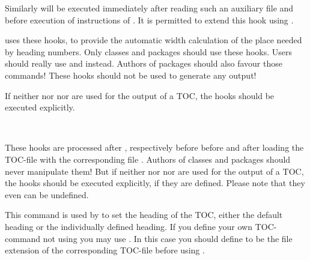 Similarly  will be executed immediately after
reading such an auxiliary file and before execution of instructions of
. It is permitted to extend this hook using
.

\KOMAScript{} uses these hooks, to provide the automatic width calculation of
the place needed by heading numbers. Only classes and packages should use
these hooks. Users should really use
 and  instead. Authors of
packages should also favour those commands! These hooks should not be used to
generate any output!

If neither  nor 
nor  are used for the output of a TOC, the hooks should be
executed explicitly.%
%
%

\begin{Declaration}
  \\
\end{Declaration}
%
%
These hooks are processed after , respectively
before  before and after loading the TOC-file with
the corresponding file . Authors  of
classes and packages should never manipulate them! But if
neither  nor  nor
 are used for the output of a TOC, the hooks should be
executed explicitly, if they are defined. Please note that they even can be
undefined.%
%
%

\begin{Declaration}
\end{Declaration}
%
This command is used by  to set the heading of the TOC,
either the default heading or the individually defined heading. If you define
your own TOC-command not using  you may use
. In this case you should define
 to be the file
extension of the corresponding TOC-file before using
.%
%

